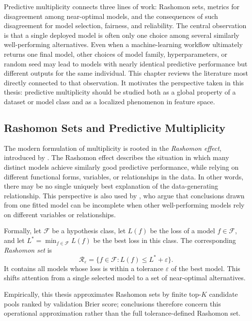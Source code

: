 
Predictive multiplicity connects three lines of work: Rashomon sets, metrics for
disagreement among near\hyp{}optimal models, and the consequences of such disagreement
for model selection, fairness, and reliability. The central observation is that a single
deployed model is often only one choice among several similarly well\hyp{}performing
alternatives. Even when a machine-learning workflow ultimately returns one final model,
other choices of model family, hyperparameters, or random seed may lead to models with
nearly identical predictive performance but different outputs for the same individual.
This chapter reviews the literature most directly connected to that observation. It motivates the perspective taken in this thesis: predictive multiplicity should be studied both as a global property of a dataset or model class and as a localized phenomenon in feature space.

\subsection{Rashomon Sets and Predictive Multiplicity}

The modern formulation of multiplicity is rooted in the \emph{Rashomon effect},
introduced by \cite{breiman_statistical_2001}. The Rashomon effect describes the situation 
in which many distinct models achieve similarly good predictive performance, while relying
on different functional forms, variables, or relationships in the data. In other words, there
may be no single uniquely best explanation of the data-generating relationship. This perspective
is also used by \cite{fisher2019all}, who argue that conclusions drawn from one fitted model
can be incomplete when other well-performing models rely on different variables or
relationships.

Formally, let $\mathcal{F}$ be a hypothesis class, let $L(f)$ be the loss of a model
$f \in \mathcal{F}$, and let $L^* = \min_{f \in \mathcal{F}} L(f)$ be the best loss in this
class. The corresponding \emph{Rashomon set} is
\[
  \mathcal{R}_\varepsilon
  = \bigl\{f \in \mathcal{F} : L(f) \leq L^{*} + \varepsilon\bigr\}.
\]
It contains all models whose loss is within a tolerance $\varepsilon$ of the best model.
This shifts attention from a single selected model to a set of near-optimal alternatives.

Empirically, this thesis approximates Rashomon sets by finite top-$K$ candidate pools ranked 
by validation Brier score; conclusions therefore concern this operational approximation rather
than the full tolerance-defined Rashomon set.

